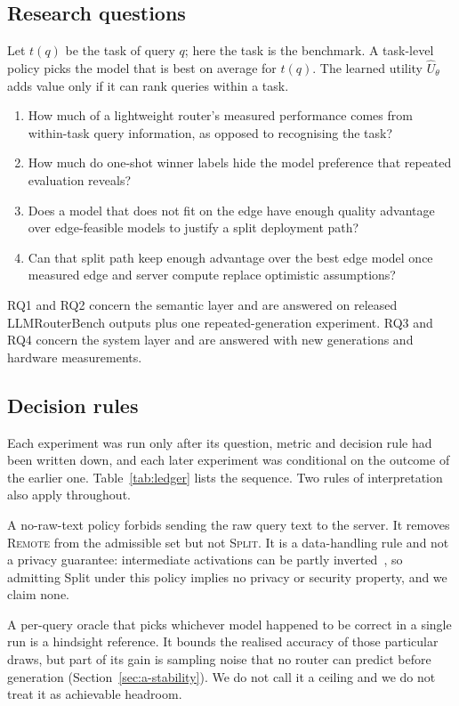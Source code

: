 \documentclass[lettersize,journal]{IEEEtran}
\begin{document}
\subsection{Research questions}
Let $t(q)$ be the task of query $q$; here the task is the benchmark. A task-level policy picks the model that is best on average for $t(q)$. The learned utility $\hat U_\theta$ adds value only if it can rank queries within a task.

\begin{enumerate}
\item[RQ1] How much of a lightweight router's measured performance comes from within-task query information, as opposed to recognising the task?
\item[RQ2] How much do one-shot winner labels hide the model preference that repeated evaluation reveals?
\item[RQ3] Does a model that does not fit on the edge have enough quality advantage over edge-feasible models to justify a split deployment path?
\item[RQ4] Can that split path keep enough advantage over the best edge model once measured edge and server compute replace optimistic assumptions?
\end{enumerate}
RQ1 and RQ2 concern the semantic layer and are answered on released LLMRouterBench outputs plus one repeated-generation experiment. RQ3 and RQ4 concern the system layer and are answered with new generations and hardware measurements.

\subsection{Decision rules}
Each experiment was run only after its question, metric and decision rule had been written down, and each later experiment was conditional on the outcome of the earlier one. Table~\ref{tab:ledger} lists the sequence. Two rules of interpretation also apply throughout.

A no-raw-text policy forbids sending the raw query text to the server. It removes \textsc{Remote} from the admissible set but not \textsc{Split}. It is a data-handling rule and not a privacy guarantee: intermediate activations can be partly inverted~\cite{cunningham2026privacy}, so admitting Split under this policy implies no privacy or security property, and we claim none.

A per-query oracle that picks whichever model happened to be correct in a single run is a hindsight reference. It bounds the realised accuracy of those particular draws, but part of its gain is sampling noise that no router can predict before generation (Section~\ref{sec:a-stability}). We do not call it a ceiling and we do not treat it as achievable headroom.
\end{document}
